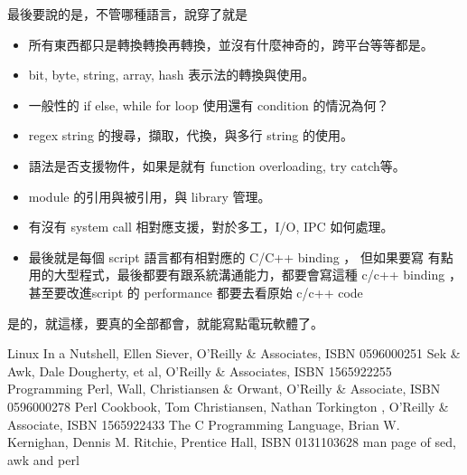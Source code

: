 最後要說的是，不管哪種語言，說穿了就是
\begin{itemize}
  \item 所有東西都只是轉換轉換再轉換，並沒有什麼神奇的，跨平台等等都是。
  \item bit, byte, string, array, hash 表示法的轉換與使用。
  \item 一般性的 if else, while for loop 使用還有 condition 的情況為何？
  \item regex string 的搜尋，擷取，代換，與多行 string 的使用。
  \item 語法是否支援物件，如果是就有 function overloading, try catch等。
  \item module 的引用與被引用，與 library 管理。
  \item 有沒有 system call 相對應支援，對於多工，I/O, IPC 如何處理。
  \item 最後就是每個 script 語言都有相對應的 C/C++ binding ， 但如果要寫
    有點用的大型程式，最後都要有跟系統溝通能力，都要會寫這種 c/c++ binding
    ，甚至要改進script 的 performance 都要去看原始 c/c++ code
\end{itemize}
是的，就這樣，要真的全部都會，就能寫點電玩軟體了。

\begin{thebibliography}{99}
  Linux In a Nutshell, Ellen Siever, O'Reilly 
  \& Associates, ISBN 0596000251
  Sek \& Awk, Dale Dougherty, et al, O'Reilly 
  \& Associates, ISBN 1565922255
  Programming Perl, Wall, Christiansen \& Orwant,
  O'Reilly \& Associate, ISBN 0596000278
  Perl Cookbook, Tom Christiansen, Nathan Torkington ,
  O'Reilly \& Associate, ISBN 1565922433
  The C Programming Language, Brian W. Kernighan, 
  Dennis M. Ritchie, Prentice Hall, ISBN 0131103628
  man page of sed, awk and perl
\end{thebibliography}
